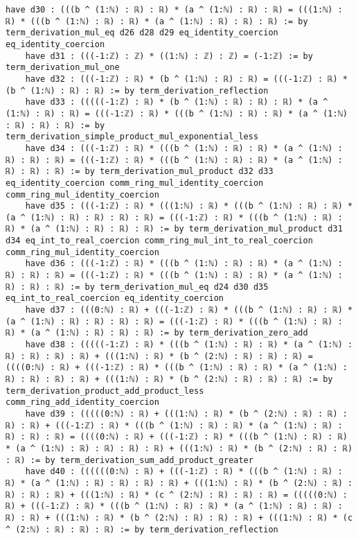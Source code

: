 \documentclass{article}
\begin{document}
\begin{tcolorbox}[colback=white!10, width=\linewidth]
\begin{lstlisting}[language=Lean4]
    have d30 : (((b ^ (1:ℕ) : ℝ) : ℝ) * (a ^ (1:ℕ) : ℝ) : ℝ) = (((1:ℕ) : ℝ) * (((b ^ (1:ℕ) : ℝ) : ℝ) * (a ^ (1:ℕ) : ℝ) : ℝ) : ℝ) := by term_derivation_mul_eq d26 d28 d29 eq_identity_coercion eq_identity_coercion
    have d31 : (((-1:ℤ) : ℤ) * ((1:ℕ) : ℤ) : ℤ) = (-1:ℤ) := by term_derivation_mul_one
    have d32 : (((-1:ℤ) : ℝ) * (b ^ (1:ℕ) : ℝ) : ℝ) = (((-1:ℤ) : ℝ) * (b ^ (1:ℕ) : ℝ) : ℝ) := by term_derivation_reflection
    have d33 : (((((-1:ℤ) : ℝ) * (b ^ (1:ℕ) : ℝ) : ℝ) : ℝ) * (a ^ (1:ℕ) : ℝ) : ℝ) = (((-1:ℤ) : ℝ) * (((b ^ (1:ℕ) : ℝ) : ℝ) * (a ^ (1:ℕ) : ℝ) : ℝ) : ℝ) := by term_derivation_simple_product_mul_exponential_less
    have d34 : (((-1:ℤ) : ℝ) * (((b ^ (1:ℕ) : ℝ) : ℝ) * (a ^ (1:ℕ) : ℝ) : ℝ) : ℝ) = (((-1:ℤ) : ℝ) * (((b ^ (1:ℕ) : ℝ) : ℝ) * (a ^ (1:ℕ) : ℝ) : ℝ) : ℝ) := by term_derivation_mul_product d32 d33 eq_identity_coercion comm_ring_mul_identity_coercion comm_ring_mul_identity_coercion
    have d35 : (((-1:ℤ) : ℝ) * (((1:ℕ) : ℝ) * (((b ^ (1:ℕ) : ℝ) : ℝ) * (a ^ (1:ℕ) : ℝ) : ℝ) : ℝ) : ℝ) = (((-1:ℤ) : ℝ) * (((b ^ (1:ℕ) : ℝ) : ℝ) * (a ^ (1:ℕ) : ℝ) : ℝ) : ℝ) := by term_derivation_mul_product d31 d34 eq_int_to_real_coercion comm_ring_mul_int_to_real_coercion comm_ring_mul_identity_coercion
    have d36 : (((-1:ℤ) : ℝ) * (((b ^ (1:ℕ) : ℝ) : ℝ) * (a ^ (1:ℕ) : ℝ) : ℝ) : ℝ) = (((-1:ℤ) : ℝ) * (((b ^ (1:ℕ) : ℝ) : ℝ) * (a ^ (1:ℕ) : ℝ) : ℝ) : ℝ) := by term_derivation_mul_eq d24 d30 d35 eq_int_to_real_coercion eq_identity_coercion
    have d37 : (((0:ℕ) : ℝ) + (((-1:ℤ) : ℝ) * (((b ^ (1:ℕ) : ℝ) : ℝ) * (a ^ (1:ℕ) : ℝ) : ℝ) : ℝ) : ℝ) = (((-1:ℤ) : ℝ) * (((b ^ (1:ℕ) : ℝ) : ℝ) * (a ^ (1:ℕ) : ℝ) : ℝ) : ℝ) := by term_derivation_zero_add
    have d38 : (((((-1:ℤ) : ℝ) * (((b ^ (1:ℕ) : ℝ) : ℝ) * (a ^ (1:ℕ) : ℝ) : ℝ) : ℝ) : ℝ) + (((1:ℕ) : ℝ) * (b ^ (2:ℕ) : ℝ) : ℝ) : ℝ) = ((((0:ℕ) : ℝ) + (((-1:ℤ) : ℝ) * (((b ^ (1:ℕ) : ℝ) : ℝ) * (a ^ (1:ℕ) : ℝ) : ℝ) : ℝ) : ℝ) + (((1:ℕ) : ℝ) * (b ^ (2:ℕ) : ℝ) : ℝ) : ℝ) := by term_derivation_product_add_product_less comm_ring_add_identity_coercion
    have d39 : (((((0:ℕ) : ℝ) + (((1:ℕ) : ℝ) * (b ^ (2:ℕ) : ℝ) : ℝ) : ℝ) : ℝ) + (((-1:ℤ) : ℝ) * (((b ^ (1:ℕ) : ℝ) : ℝ) * (a ^ (1:ℕ) : ℝ) : ℝ) : ℝ) : ℝ) = ((((0:ℕ) : ℝ) + (((-1:ℤ) : ℝ) * (((b ^ (1:ℕ) : ℝ) : ℝ) * (a ^ (1:ℕ) : ℝ) : ℝ) : ℝ) : ℝ) + (((1:ℕ) : ℝ) * (b ^ (2:ℕ) : ℝ) : ℝ) : ℝ) := by term_derivation_sum_add_product_greater
    have d40 : ((((((0:ℕ) : ℝ) + (((-1:ℤ) : ℝ) * (((b ^ (1:ℕ) : ℝ) : ℝ) * (a ^ (1:ℕ) : ℝ) : ℝ) : ℝ) : ℝ) + (((1:ℕ) : ℝ) * (b ^ (2:ℕ) : ℝ) : ℝ) : ℝ) : ℝ) + (((1:ℕ) : ℝ) * (c ^ (2:ℕ) : ℝ) : ℝ) : ℝ) = (((((0:ℕ) : ℝ) + (((-1:ℤ) : ℝ) * (((b ^ (1:ℕ) : ℝ) : ℝ) * (a ^ (1:ℕ) : ℝ) : ℝ) : ℝ) : ℝ) + (((1:ℕ) : ℝ) * (b ^ (2:ℕ) : ℝ) : ℝ) : ℝ) + (((1:ℕ) : ℝ) * (c ^ (2:ℕ) : ℝ) : ℝ) : ℝ) := by term_derivation_reflection

\end{lstlisting}
\end{tcolorbox}
\end{document}
